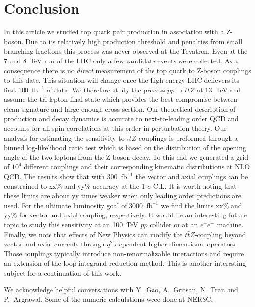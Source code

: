 \documentclass[preprint]{JHEP3} %
\def\ttbZ{t\bar{t}Z}
\def\invfb {\mathrm{fb}^{-1}}
\begin{document}
\section{Conclusion}
In this article we studied top quark pair production in association with a Z-boson.
Due to its relatively high production threshold and 
penalties from small branching fractions 
this process was never observed at the Tevatron.
Even at the 7 and 8~TeV run of the LHC only a few candidate events were collected.
As a consequence there is no {\it direct} measurement of the top quark to Z-boson couplings to this date. 
This situation will change once the high energy LHC delievers its first 100~$\invfb$ of data.
We therefore study the process $pp\to\ttbZ$ at 13~TeV and assume the tri-lepton final state  
which provides the best compromise between clean signature and large enough cross section. 
Our theoretical description of production and decay dynamics is accurate to next-to-leading order QCD and
accounts for all spin correlations at this order in perturbation theory. 
Our analysis for estimating the sensitivity to $\ttbZ$-couplings is preformed through a binned log-likelihood ratio test which is based on the 
distribution of the opening angle of the two leptons from the Z-boson decay.
To this end we generated a grid of $10^4$ different couplings and their corresponding kinematic distributions at NLO QCD. 
The results show that with 300~$\invfb$ the vector and axial couplings can be constrained to xx\% and yy\% accuracy at the 1-$\sigma$ C.L.
It is worth noting that these limits are about yy times weaker when only leading order predictions are used. 
For the ultimate luminosity goal of 3000~$\invfb$ we find the limits xx\% and yy\% for vector and axial coupling, respectively.
It would be an interesting future topic to study this sensitivity at an 100~TeV $pp$ collider or at an $e^+ e^-$ machine.
Finally, we note that effects of New Physics can modify the $\ttbZ$-coupling beyond vector and axial currents through $q^2$-dependent  higher dimensional operators. 
Those couplings typically introduce non-renormalizable interactions and require an extension of the loop integrand reduction method. 
This is another interesting subject for a continuation of this work.



\acknowledgments
We acknowledge helpful conversations with Y.~Gao, A.~Gritsan, N.~Tran and P.~Argrawal. 
Some of the numeric calculations weee done at NERSC.





\end{document}
